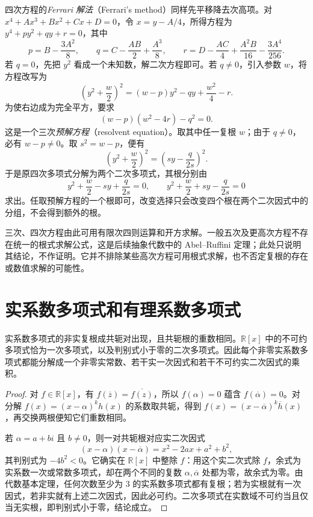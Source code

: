 四次方程的\emph{Ferrari 解法}（Ferrari's method）同样先平移降去次高项。对 $x^4+Ax^3+Bx^2+Cx+D=0$，令 $x=y-A/4$，所得方程为 $y^4+py^2+qy+r=0$，其中
\[
    p=B-\frac{3A^2}{8},\qquad
    q=C-\frac{AB}{2}+\frac{A^3}{8},\qquad
    r=D-\frac{AC}{4}+\frac{A^2B}{16}-\frac{3A^4}{256}.
\]
若 $q=0$，先把 $y^2$ 看成一个未知数，解二次方程即可。若 $q\ne0$，引入参数 $w$，将方程改写为
\[
    \left(y^2+\frac w2\right)^2
    =(w-p)y^2-qy+\frac{w^2}{4}-r.
\]
为使右边成为完全平方，要求
\begin{equation}
\label{eq:ferrari-resolvent}
    (w-p)(w^2-4r)-q^2=0.
\end{equation}
这是一个三次\emph{预解方程}（resolvent equation）。取其中任一复根 $w$；由于 $q\ne0$，必有 $w-p\ne0$。取 $s^2=w-p$，便有
\[
    \left(y^2+\frac w2\right)^2
    =\left(sy-\frac{q}{2s}\right)^2.
\]
于是原四次多项式分解为两个二次多项式，其根分别由
\[
    y^2+\frac w2-sy+\frac{q}{2s}=0,
    \qquad
    y^2+\frac w2+sy-\frac{q}{2s}=0
\]
求出。任取预解方程的一个根即可，改变选择只会改变四个根在两个二次因式中的分组，不会得到额外的根。

三次、四次方程由此可用有限次四则运算和开方求解。一般五次及更高次方程不存在统一的根式求解公式，这是后续抽象代数中的 Abel--Ruffini 定理；此处只说明其结论，不作证明。它并不排除某些高次方程可用根式求解，也不否定复根的存在或数值求解的可能性。

\section{实系数多项式和有理系数多项式}
\label{sec:real-rational-polynomials}

\begin{theorem}
\label{thm:real-polynomial-factorization}
实系数多项式的非实复根成共轭对出现，且共轭根的重数相同。$\mathbb R[x]$ 中的不可约多项式恰为一次多项式，以及判别式小于零的二次多项式。因此每个非零实系数多项式都能分解成一个非零实常数、若干实一次因式和若干不可约实二次因式的乘积。
\end{theorem}
\begin{proof}
对 $f\in\mathbb R[x]$，有 $f(\overline z)=\overline{f(z)}$，所以 $f(\alpha)=0$ 蕴含 $f(\overline\alpha)=0$。对分解 $f(x)=(x-\alpha)^kh(x)$ 的系数取共轭，得到 $f(x)=(x-\overline\alpha)^k\overline h(x)$，再交换两根便知它们重数相同。

若 $\alpha=a+bi$ 且 $b\ne0$，则一对共轭根对应实二次因式
\[
    (x-\alpha)(x-\overline\alpha)
    =x^2-2ax+a^2+b^2,
\]
其判别式为 $-4b^2<0$。它确实在 $\mathbb R[x]$ 中整除 $f$：用这个实二次式除 $f$，余式为实系数一次或常数多项式，却在两个不同的复数 $\alpha,\overline\alpha$ 处都为零，故余式为零。由代数基本定理，任何次数至少为 $3$ 的实系数多项式都有复根；若为实根就有一次因式，若非实就有上述二次因式，因此必可约。二次多项式在实数域不可约当且仅当无实根，即判别式小于零，结论成立。
\end{proof}

